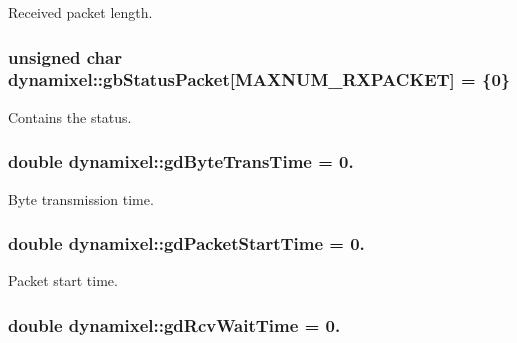 Received packet length. 

\hypertarget{a00003_aa57c86d3bbbeaf5c9d4f6bd00376b04f}{}
\subsubsection[{gb\+Status\+Packet}]{\setlength{\rightskip}{0pt plus 5cm}unsigned char dynamixel\+::gb\+Status\+Packet\mbox{[}M\+A\+X\+N\+U\+M\+\_\+\+R\+X\+P\+A\+C\+K\+E\+T\mbox{]} = \{0\}\hspace{0.3cm}{\ttfamily [private]}}\label{a00003_aa57c86d3bbbeaf5c9d4f6bd00376b04f}


Contains the status. 

\hypertarget{a00003_a2173f25c6299da7ddb37ba3d2bf1f738}{}
\subsubsection[{gd\+Byte\+Trans\+Time}]{\setlength{\rightskip}{0pt plus 5cm}double dynamixel\+::gd\+Byte\+Trans\+Time = 0.\hspace{0.3cm}{\ttfamily [private]}}\label{a00003_a2173f25c6299da7ddb37ba3d2bf1f738}


Byte transmission time. 

\hypertarget{a00003_a6c6314fb7070e6fd361e57c5de17e0ec}{}
\subsubsection[{gd\+Packet\+Start\+Time}]{\setlength{\rightskip}{0pt plus 5cm}double dynamixel\+::gd\+Packet\+Start\+Time = 0.\hspace{0.3cm}{\ttfamily [private]}}\label{a00003_a6c6314fb7070e6fd361e57c5de17e0ec}


Packet start time. 

\hypertarget{a00003_a9f47887864517d74955a2bc787ae4456}{}
\subsubsection[{gd\+Rcv\+Wait\+Time}]{\setlength{\rightskip}{0pt plus 5cm}double dynamixel\+::gd\+Rcv\+Wait\+Time = 0.\hspace{0.3cm}{\ttfamily [private]}}\label{a00003_a9f47887864517d74955a2bc787ae4456}


